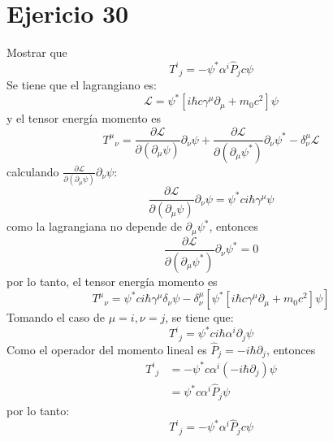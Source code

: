 \section*{Ejericio 30}
Mostrar que
\begin{equation*}
    {T^i}_j = -\psi^* \alpha^i \hat{P}_j c \psi
\end{equation*}
Se tiene que el lagrangiano es:
\begin{equation*}
    \mathcal{L} = \psi^* \left[i\hbar c \gamma^\mu \partial_\mu + m_0 c^2\right] \psi
\end{equation*}
y el tensor energía momento es
\begin{equation*}
    {T^\mu}_\nu = \frac{\partial \mathcal{L}}{\partial (\partial_\mu \psi)} \partial_\nu \psi + 
    \frac{\partial \mathcal{L}}{\partial (\partial_\mu \psi^*)} \partial_\nu \psi^* -\delta_{\nu}^\mu \mathcal{L}
\end{equation*}
calculando $\frac{\partial \mathcal{L}}{\partial (\partial_\mu \psi)} \partial_\nu \psi $:
\begin{equation*}
    \frac{\partial \mathcal{L}}{\partial (\partial_\mu \psi)} \partial_\nu \psi  = \psi^* ci \hbar \gamma^\mu \psi
\end{equation*}
como la lagrangiana no depende de $\partial_\mu \psi^*$, entonces 
\begin{equation*}
    \frac{\partial \mathcal{L}}{\partial (\partial_\mu \psi^*)} \partial_\nu \psi^*  =0
\end{equation*}
por lo tanto, el tensor energía momento es
\begin{equation*}
    {T^\mu}_\nu = \psi^* ci \hbar \gamma^\mu \delta_\nu\psi - \delta^\mu_\nu \left[\psi^* \left[i\hbar c \gamma^\mu \partial_\mu + m_0 c^2\right] \psi\right]
\end{equation*}
Tomando el caso de $\mu=i , \nu=j$, se tiene que:
\begin{equation*}
    {T^i}_j= \psi^* ci \hbar \alpha^i \partial_j\psi
\end{equation*}
Como el operador del momento lineal es $\hat{P}_j = -i\hbar \partial_j$, entonces
\begin{align*}
    {T^i}_j &= -\psi^* c \alpha^i (-i\hbar \partial_j) \psi \\
    &=\psi^* c\alpha^i \hat{P}_j \psi
\end{align*}
por lo tanto:
\begin{equation*}
    {T^i}_j = -\psi^* \alpha^i \hat{P}_j c \psi
\end{equation*}